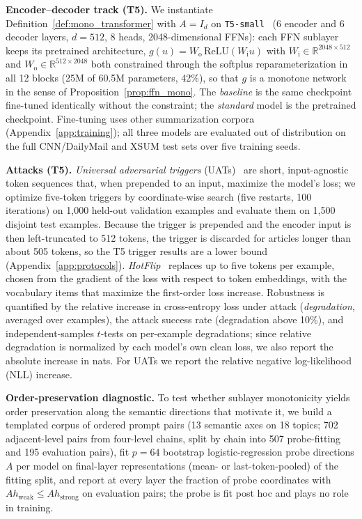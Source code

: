 \documentclass{article}
\theoremstyle{plain}
\theoremstyle{definition}
\theoremstyle{remark}
\theoremstyle{plain}
\begin{document}
\textbf{Encoder--decoder track (T5).}
We instantiate Definition~\ref{def:mono_transformer} with $A = I_d$ on \texttt{T5-small}~\citep{raffel2020exploring} (6 encoder and 6 decoder layers, $d = 512$, 8 heads, 2048-dimensional FFNs): each FFN sublayer keeps its pretrained architecture, $g(u) = W_{\mathrm{o}}\,\mathrm{ReLU}(W_{\mathrm{i}} u)$ with $W_{\mathrm{i}}\in\mathbb{R}^{2048\times 512}$ and $W_{\mathrm{o}}\in\mathbb{R}^{512\times 2048}$ both constrained through the softplus reparameterization in all 12 blocks (25M of 60.5M parameters, 42\%), so that $g$ is a monotone network in the sense of Proposition~\ref{prop:ffn_mono}. The \emph{baseline} is the same checkpoint fine-tuned identically without the constraint; the \emph{standard} model is the pretrained checkpoint. Fine-tuning uses other summarization corpora (Appendix~\ref{app:training}); all three models are evaluated out of distribution on the full CNN/DailyMail and XSUM test sets over five training seeds.

\textbf{Attacks (T5).}
\label{sec:setup-attacks}
\emph{Universal adversarial triggers} (UATs)~\citep{wallace2019universal} are short, input-agnostic token sequences that, when prepended to an input, maximize the model's loss; we optimize five-token triggers by coordinate-wise search (five restarts, 100 iterations) on 1{,}000 held-out validation examples and evaluate them on 1{,}500 disjoint test examples. Because the trigger is prepended and the encoder input is then left-truncated to 512 tokens, the trigger is discarded for articles longer than about 505 tokens, so the T5 trigger results are a lower bound (Appendix~\ref{app:protocols}). \emph{HotFlip}~\citep{ebrahimi2018hotflip} replaces up to five tokens per example, chosen from the gradient of the loss with respect to token embeddings, with the vocabulary items that maximize the first-order loss increase. Robustness is quantified by the relative increase in cross-entropy loss under attack (\emph{degradation}, averaged over examples), the attack success rate (degradation above 10\%), and independent-samples $t$-tests on per-example degradations; since relative degradation is normalized by each model's own clean loss, we also report the absolute increase in nats. For UATs we report the relative negative log-likelihood (NLL) increase.

\textbf{Order-preservation diagnostic.}
To test whether sublayer monotonicity yields order preservation along the semantic directions that motivate it, we build a templated corpus of ordered prompt pairs (13 semantic axes on 18 topics; 702 adjacent-level pairs from four-level chains, split by chain into 507 probe-fitting and 195 evaluation pairs), fit $p = 64$ bootstrap logistic-regression probe directions $A$ per model on final-layer representations (mean- or last-token-pooled) of the fitting split, and report at every layer the fraction of probe coordinates with $A h_{\mathrm{weak}} \le A h_{\mathrm{strong}}$ on evaluation pairs; the probe is fit post hoc and plays no role in training.
\end{document}
